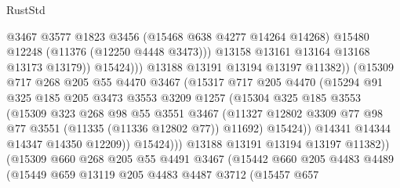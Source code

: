 \begin{lexlean}{RustStd}
\begin{coremodule}
{{{{{{{{{{{{{{{{{{{                                @3467
                                @3577
                                @1823
                                @3456
                                (@15468 @638 @4277 @14264 @14268)
                                @15480
                                @12248
                                (@11376 (@12250 @4448 @3473)))
                              @13158
                              @13161
                              @13164
                              @13168
                              @13173
                              @13179))
                          @15424)))
                    @13188
                    @13191
                    @13194
                    @13197
                    @11382))
                (@15309
                  @717
                  @268
                  @205
                  @55
                  @4470
                  @3467
                  (@15317
                    @717
                    @205
                    @4470
                    (@15294
                      @91
                      @325
                      @185
                      @205
                      @3473
                      @3553
                      @3209
                      @1257
                      (@15304
                        @325
                        @185
                        @3553
                        (@15309
                          @323
                          @268
                          @98
                          @55
                          @3551
                          @3467
                          (@11327
                            @12802
                            @3309
                            @77
                            @98
                            @77
                            @3551
                            (@11335 (@11336 @12802 @77))
                            @11692)
                          @15424))
                      @14341
                      @14344
                      @14347
                      @14350
                      @12209))
                  @15424)))
            @13188
            @13191
            @13194
            @13197
            @11382))
        (@15309
          @660
          @268
          @205
          @55
          @4491
          @3467
          (@15442
            @660
            @205
            @4483
            @4489
            (@15449
              @659
              @13119
              @205
              @4483
              @4487
              @3712
              (@15457
                @657
}}}}}}}}}}}}}}}}}}}
\end{coremodule}
\end{lexlean}
